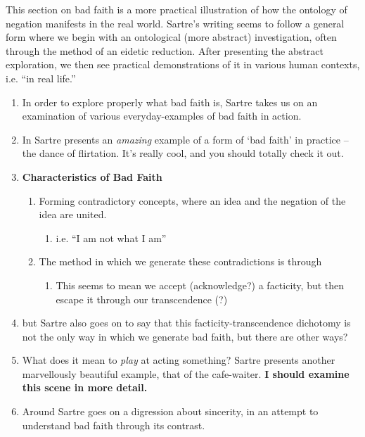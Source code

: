 This section on bad faith is a more practical illustration of how the ontology of negation manifests in the real world. Sartre's writing seems to follow a general form where we begin with an ontological (more abstract) investigation, often through the method of an eidetic reduction. After presenting the abstract exploration, we then see practical demonstrations of it in various human contexts, i.e. \enquote{in real life.}

\begin{enumerate}
  \item In order to explore properly what bad faith is, Sartre takes us on an examination of various everyday-examples of bad faith in action.
  \item In \autocite[98]{sartre} Sartre presents an \emph{amazing} example of a form of `bad faith' in practice -- the dance of flirtation. It's really cool, and you should totally check it out.
  \item \textbf{Characteristics of Bad Faith}
  \begin{enumerate}
    \item Forming contradictory concepts, where an idea and the negation of the idea are united.
    \begin{enumerate}
      \item i.e. \enquote{I am not what I am}
    \end{enumerate}
    \item The method in which we generate these contradictions is through 
    \begin{enumerate}
      \item This seems to mean we accept (acknowledge?) a facticity, but then escape it through our transcendence (?)
    \end{enumerate}
  \end{enumerate}
  \item but Sartre also goes on to say that this facticity-transcendence dichotomy is not the only way in which we generate bad faith, but there are other ways?
  \item \autocite[102]{sartre} What does it mean to \emph{play} at acting something? Sartre presents another marvellously beautiful example, that of the cafe-waiter. \textbf{I should examine this scene in more detail.}
  \item Around \autocite[109]{sartre} Sartre goes on a digression about sincerity, in an attempt to understand bad faith through its contrast.

\end{enumerate}
